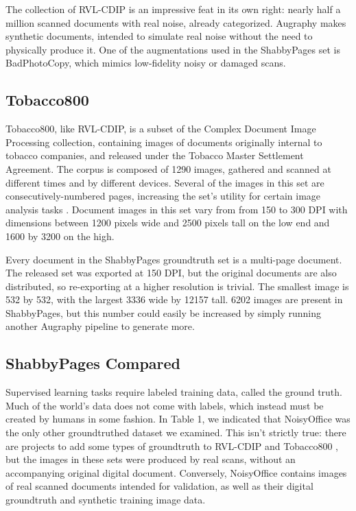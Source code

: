 \documentclass[runningheads]{llncs}
\begin{document}
The collection of RVL-CDIP is an impressive feat in its own right: nearly half a million scanned documents with real noise, already categorized.
Augraphy makes synthetic documents, intended to simulate real noise without the need to physically produce it.
One of the augmentations used in the ShabbyPages set is BadPhotoCopy, which mimics low-fidelity noisy or damaged scans.

\subsection{Tobacco800}
Tobacco800, like RVL-CDIP, is a subset of the Complex Document Image Processing collection, containing images of documents originally internal to tobacco companies, and released under the Tobacco Master Settlement Agreement.
The corpus is composed of 1290 images, gathered and scanned at different times and by different devices.
Several of the images in this set are consecutively-numbered pages, increasing the set's utility for certain image analysis tasks \cite{ref_Tobacco800}.
Document images in this set vary from from 150 to 300 DPI with dimensions between 1200 pixels wide and 2500 pixels tall on the low end and 1600 by 3200 on the high.

Every document in the ShabbyPages groundtruth set is a multi-page document.
The released set was exported at 150 DPI, but the original documents are also distributed, so re-exporting at a higher resolution is trivial.
The smallest image is 532 by 532, with the largest 3336 wide by 12157 tall.
6202 images are present in ShabbyPages, but this number could easily be increased by simply running another Augraphy pipeline to generate more.

\subsection{ShabbyPages Compared}
Supervised learning tasks require labeled training data, called the ground truth.
Much of the world's data does not come with labels, which instead must be created by humans in some fashion.
In Table 1, we indicated that NoisyOffice was the only other groundtruthed dataset we examined.
This isn't strictly true: there are projects to add some types of groundtruth to RVL-CDIP \cite{ref_zenodo,ref_goldmann} and Tobacco800 \cite{ref_tobacco800gt2,ref_tobacco800gt1}, but the images in these sets were produced by real scans, without an accompanying original digital document.
Conversely, NoisyOffice contains images of real scanned documents intended for validation, as well as their digital groundtruth and synthetic training image data.
\end{document}
